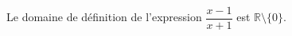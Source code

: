 Le domaine de définition de l'expression $\dfrac{x-1}{x+1}$ est $\mathbb R \setminus \{0\}$.

\begin{reponses}
\end{reponses}

